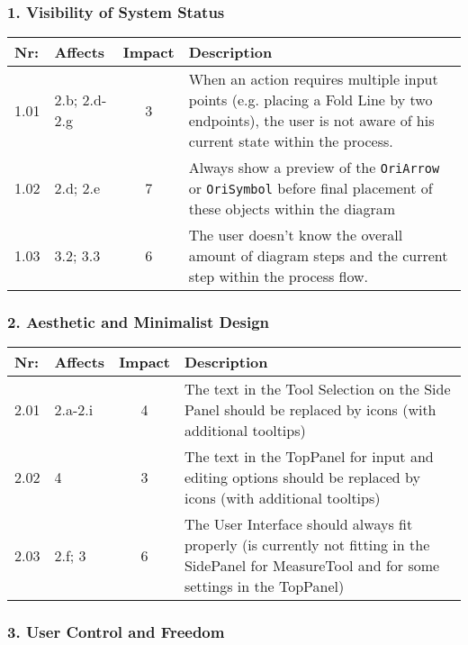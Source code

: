 \subsubsection*{1. Visibility of System Status}
\label{sec:visibility}

        \begin{tabular}{l | p{} | c | p{}}
        Nr: & Affects & Impact & Description \\ \hline
        1.01 & 2.b; 2.d-2.g & 3 & When an action requires multiple input points (e.g. placing a Fold Line by two endpoints), the user is not aware of his current state within the process. \\ \hline 
        1.02 & 2.d; 2.e & 7 & Always show a preview of the \texttt{OriArrow} or \texttt{OriSymbol} before final placement of these objects within the diagram\\ \hline
        1.03 & 3.2; 3.3 & 6 & The user doesn't know the overall amount of diagram steps and the current step within the process flow.\\ \hline
        \end{tabular}


\subsubsection*{2. Aesthetic and Minimalist Design}
        \begin{tabular}{l | p{} | c | p{}}
        Nr: & Affects & Impact & Description \\ \hline
        2.01 & 2.a-2.i  & 4 &  The text in the Tool Selection on the Side Panel should be replaced by icons (with additional tooltips)\\ \hline 
	2.02 & 4 & 3 & The text in the TopPanel for input and editing options should be replaced by icons (with additional tooltips)\\ \hline
	2.03 & 2.f; 3 & 6 & The User Interface should always fit properly (is currently not fitting in the SidePanel for MeasureTool and for some settings in the TopPanel)\\ \hline
        \end{tabular}

\subsubsection*{3. User Control and Freedom}

